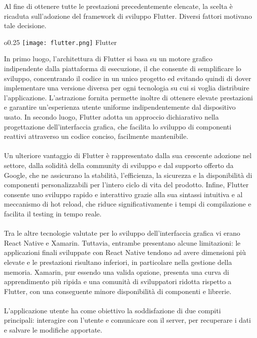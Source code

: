 Al fine di ottenere tutte le prestazioni precedentemente elencate,
la scelta è ricaduta sull'adozione del framework di sviluppo Flutter.
Diversi fattori motivano tale decisione. \\
\begin{wrapfigure}{o}{0.25\textwidth}
    \centering
    \texttt{[image: flutter.png]}
    Flutter
\end{wrapfigure}
In primo luogo, l'architettura di Flutter si basa su un motore grafico
indipendente dalla piattaforma di esecuzione,
il che consente di semplificare lo sviluppo,
concentrando il codice in un unico progetto ed
evitando quindi di dover implementare una versione diversa
per ogni tecnologia su cui si voglia distribuire l'applicazione.
L'astrazione fornita permette inoltre di ottenere elevate prestazioni e
garantire un'esperienza utente uniforme indipendentemente dal dispositivo usato.
In secondo luogo, Flutter adotta un approccio dichiarativo
nella progettazione dell'interfaccia grafica,
che facilita lo sviluppo di componenti reattivi attraverso un codice conciso,
facilmente mantenibile.\\
\\
Un ulteriore vantaggio di Flutter è rappresentato dalla sua crescente adozione nel settore,
dalla solidità della community di sviluppo e dal supporto offerto da Google,
che ne assicurano la stabilità, l'efficienza, la sicurezza e la disponibilità
di componenti personalizzabili per l'intero ciclo di vita del prodotto.
Infine, Flutter consente uno sviluppo rapido e interattivo
grazie alla sua sintassi intuitiva e al meccanismo di hot reload,
che riduce significativamente i tempi di compilazione e facilita il testing in tempo reale.\\
\\
Tra le altre tecnologie valutate per lo sviluppo dell'interfaccia grafica vi erano React Native e Xamarin.
Tuttavia, entrambe presentano alcune limitazioni:
le applicazioni finali sviluppate con React Native tendono ad avere dimensioni più elevate e
le prestazioni risultano inferiori,
in particolare nella gestione della memoria.
Xamarin, pur essendo una valida opzione, presenta una curva di apprendimento più ripida e
una comunità di sviluppatori ridotta rispetto a Flutter,
con una conseguente minore disponibilità di componenti e librerie.\\
\\
L'applicazione utente ha come obiettivo la soddisfazione di due compiti principali:
interagire con l'utente e comunicare con il server,
per recuperare i dati e salvare le modifiche apportate.

